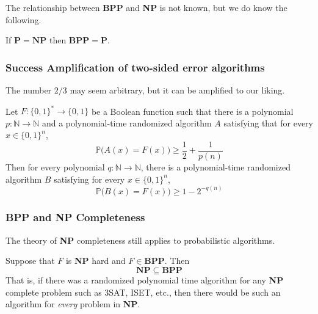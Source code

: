   The relationship between \textbf{BPP} and \textbf{NP} is not known, but we do know the following. 

  \begin{theorem}
    \label{thm:sipser-gacs-theorem}
  If $\mathbf{P = NP}$ then $\mathbf{BPP = P}$. 
  \end{theorem}

  \subsubsection{Success Amplification of two-sided error algorithms}
  The number $2/3$ may seem arbitrary, but it can be amplified to our liking.

  \begin{theorem}[Amplification]
    \label{thm:amplification}
  Let $F: \{0, 1\}^* \to \{0, 1\}$ be a Boolean function such that there is a polynomial $p: \mathbb{N} \to \mathbb{N}$ and a polynomial-time randomized algorithm $A$ satisfying that for every $x \in \{0, 1\}^n$, 
  \begin{equation}
    \mathbb{P} \big( A(x) = F(x) \big) \geq \frac{1}{2} + \frac{1}{p(n)}
  \end{equation}
  Then for every polynomial $q: \mathbb{N} \to \mathbb{N}$, there is a polynomial-time randomized algorithm $B$ satisfying for every $x \in \{0, 1\}^n$,
  \begin{equation}
    \mathbb{P} \big( B(x) = F(x)\big) \geq 1 - 2^{-q(n)}
  \end{equation}
  \end{theorem}

  \subsubsection{BPP and NP Completeness}
  The theory of \textbf{NP} completeness still applies to probabilistic algorithms. 

  \begin{theorem}
    \label{thm:np-hardness-inside-bpp-collapses-the-hierarchy}
  Suppose that $F$ is \textbf{NP} hard and $F \in \mathbf{BPP}$. Then 
  \begin{equation}
    \mathbf{NP \subseteq BPP}
  \end{equation}
  That is, if there was a randomized polynomial time algorithm for any \textbf{NP} complete problem such as 3SAT, ISET, etc., then there would be such an algorithm for \textit{every} problem in \textbf{NP}. 
  \end{theorem}

